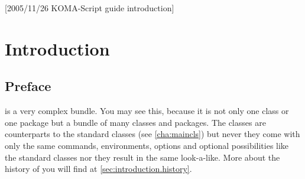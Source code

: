 %
%
%
%
%
%
%
%
% 
%
%
%
%

[2005/11/26 KOMA-Script guide introduction]

\chapter{Introduction}

\section{Preface}\label{sec:introduction.preface}

{\KOMAScript} is a very complex bundle. You may see this, because it
is not only one class or one package but a bundle of many classes and
packages. The classes are counterparts to the standard classes (see
\autoref{cha:maincls}) but never they come with only the same
commands, environments, options and optional possibilities like the
standard classes nor they result in the same look-a-like. More about
the history of \KOMAScript{} you will find at
\autoref{sec:introduction.history}.

